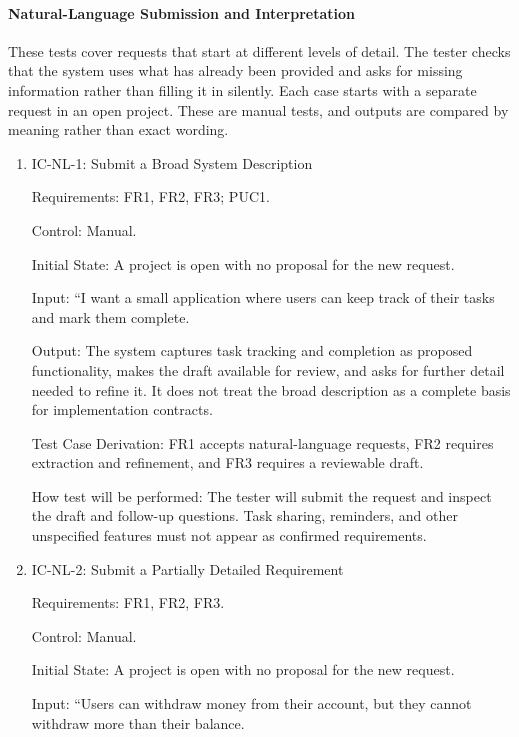 \documentclass[12pt, titlepage]{article}
\begin{document}
\paragraph{Natural-Language Submission and Interpretation}

These tests cover requests that start at different levels of detail. The
tester checks that the system uses what has already been provided and asks
for missing information rather than filling it in silently. Each case starts
with a separate request in an open project. These are manual tests, and
outputs are compared by meaning rather than exact wording.

\begin{enumerate}

\item{IC-NL-1: Submit a Broad System Description\\}

Requirements: FR1, FR2, FR3; PUC1.

Control: Manual.

Initial State: A project is open with no proposal for the new request.

Input: ``I want a small application where users can keep track of their tasks
and mark them complete.

Output: The system captures task tracking and completion as proposed
functionality, makes the draft available for review, and asks for further
detail needed to refine it. It does not treat the broad description as a
complete basis for implementation contracts.

Test Case Derivation: FR1 accepts natural-language requests, FR2 requires
extraction and refinement, and FR3 requires a reviewable draft.

How test will be performed: The tester will submit the request and inspect the
draft and follow-up questions. Task sharing, reminders, and other unspecified
features must not appear as confirmed requirements.

\item{IC-NL-2: Submit a Partially Detailed Requirement\\}

Requirements: FR1, FR2, FR3.

Control: Manual.

Initial State: A project is open with no proposal for the new request.

Input: ``Users can withdraw money from their account, but they cannot withdraw
more than their balance.


\end{enumerate}
\end{document}
